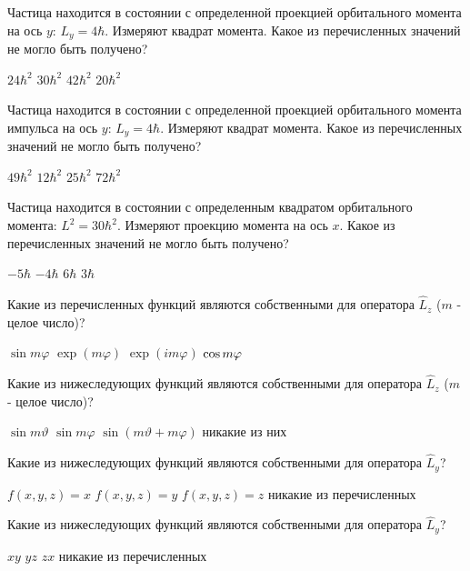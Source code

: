 \documentclass[11pt,a4paper]{exam}
\begin{document}
\begin{questions}
\question Частица находится в состоянии с определенной проекцией орбитального момента на ось $y$: ${L_y} = 4\hbar $. Измеряют квадрат момента. Какое из перечисленных значений не могло быть получено?
\begin{choices}
\choice $24{\hbar ^2}$    
\choice $30{\hbar ^2}$    
\choice $42{\hbar ^2}$    
\choice $20{\hbar ^2}$
\end{choices}

\question Частица находится в состоянии с определенной проекцией орбитального момента импульса на ось $y$: ${L_y} = 4\hbar $. Измеряют квадрат момента. Какое из перечисленных значений не могло быть получено?
\begin{choices}
\choice $49{\hbar ^2}$    
\choice $12{\hbar ^2}$    
\choice $25{\hbar ^2}$    
\choice $72{\hbar ^2}$
\end{choices}

\question Частица находится в состоянии с определенным квадратом орбитального момента: ${L^2} = 30{\hbar ^2}$. Измеряют проекцию момента на ось $x$. Какое из перечисленных значений не могло быть получено?
\begin{choices}
\choice $ - 5\hbar $      
\choice $ - 4\hbar $         
\choice $6\hbar $         
\choice $3\hbar $
\end{choices}

\question Какие из перечисленных функций являются собственными для оператора ${\hat L_z}$ ($m$ - целое число)?
\begin{choices}
\choice $\sin m\varphi $     
\choice $\exp (m\varphi )$      
\choice $\exp \left( {im\varphi } \right)$     
\choice ${\rm{cos}}\,m\varphi $
\end{choices}

\question Какие из нижеследующих функций являются собственными для оператора ${\hat L_z}$ ($m$ - целое число)?
\begin{choices}
\choice $\sin m\vartheta $      
\choice $\sin m\varphi $     
\choice $\sin \left( {m\vartheta  + m\varphi } \right)$ 
\choice никакие из них
\end{choices}

\question Какие из нижеследующих функций являются собственными для оператора ${\hat L_y}$?
\begin{choices}
\choice $f(x,y,z) = x$ 
\choice $f(x,y,z) = y$ 
\choice $f(x,y,z) = z$ 
\choice никакие из перечисленных
\end{choices}

\question Какие из нижеследующих функций являются собственными для оператора ${\hat L_y}$?
\begin{choices}
\choice $xy$        
\choice $yz$        
\choice $zx$        
\choice никакие из перечисленных
\end{choices}


\end{questions}
\end{document}
